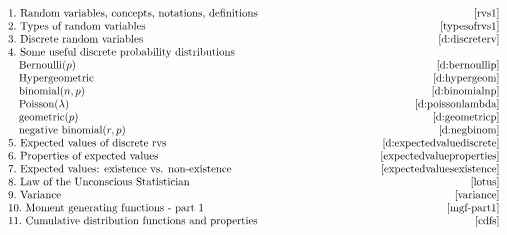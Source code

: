 \documentclass[12pt]{article}
\begin{document}
$
\begin{array}{lr}
1.\mbox{ Random variables, concepts, notations, definitions}\qquad \qquad \qquad \quad \quad \quad\ \ \ \  & \pageref{rvs1} \\
2.\mbox{ Types of random variables} & \pageref{typesofrvs1}\\
3.\mbox{ Discrete random variables} & \pageref{d:discreterv}\\
4.\mbox{ Some useful discrete probability distributions} & \\
\ \ \mbox{ Bernoulli$(p)$} & \pageref{d:bernoullip}\\
\ \ \mbox{ Hypergeometric} & \pageref{d:hypergeom}\\
\ \ \mbox{ binomial$(n,p)$} & \pageref{d:binomialnp}\\
\ \ \mbox{ Poisson$(\lambda)$} & \pageref{d:poissonlambda}\\
\ \ \mbox{ geometric$(p)$} & \pageref{d:geometricp}\\
\ \ \mbox{ negative binomial$(r,p)$} & \pageref{d:negbinom}\\
5.\mbox{ Expected values of discrete rvs} & \pageref{d:expectedvaluediscrete}\\
6.\mbox{ Properties of expected values} & \pageref{expectedvalueproperties}\\
7.\mbox{ Expected values: existence vs. non-existence} & \pageref{expectedvaluesexistence}\\
8.\mbox{ Law of the Unconscious Statistician} & \pageref{lotus}\\
9.\mbox{ Variance} & \pageref{variance}\\
10.\mbox{ Moment generating functions - part 1} & \pageref{mgf-part1}\\
11.\mbox{ Cumulative distribution functions and properties} & \pageref{cdfs}\\
\end{array}$
\bigskip

\end{document}

